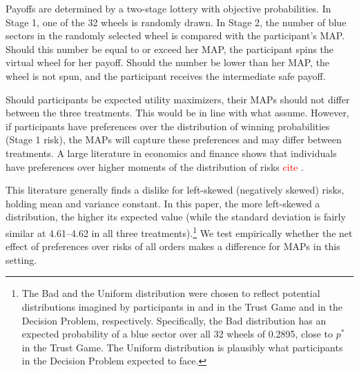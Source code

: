 Payoffs are determined by a two-stage lottery with objective probabilities.
In Stage 1, one of the 32 wheels is randomly drawn.
In Stage 2, the number of blue sectors in the randomly selected wheel is compared with the participant's MAP.
Should this number be equal to or exceed her MAP, the participant spins the virtual wheel for her payoff.
Should the number be lower than her MAP, the wheel is not spun, and the participant receives the intermediate safe payoff.

Should participants be expected utility maximizers, their MAPs should not differ between the three treatments.
This would be in line with what \cite{Bohnet2004,Bohnet2008} assume.
However, if participants have preferences over the distribution of winning probabilities (Stage 1 risk), the MAPs will capture these preferences and may differ between treatments.
A large literature in economics and finance shows that individuals have preferences over higher moments of the distribution of risks \textcolor{red}{cite} \citep{Ebert2014,Ebert2015,Grossman2015}.




This literature generally finds a dislike for left-skewed (negatively skewed) risks, holding mean and variance constant.
In this paper, the more left-skewed a distribution, the higher its expected value (while the standard deviation is fairly similar at 4.61--4.62 in all three treatments).\footnote{
The Bad and the Uniform distribution were chosen to reflect potential distributions imagined by participants in \cite{Bohnet2004} and \cite{Bohnet2008} in the Trust Game and in the Decision Problem, respectively.
Specifically, the Bad distribution has an expected probability of a blue sector over all 32 wheels of 0.2895, close to $p^*$ in the Trust Game.
The Uniform distribution is plausibly what participants in the Decision Problem expected to face.}
We test empirically whether the net effect of preferences over risks of all orders makes a difference for MAPs in this setting.

